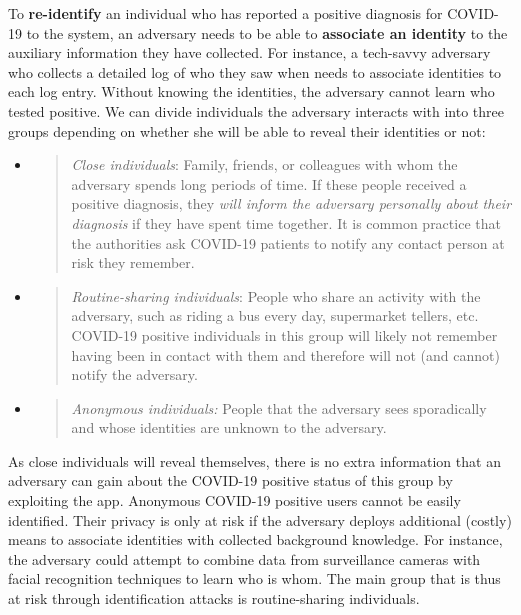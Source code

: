 \documentclass{article}
\begin{document}
To \textbf{re-identify} an individual who has reported a positive
diagnosis for COVID-19 to the system, an adversary needs to be able to
\textbf{associate an identity} to the auxiliary information they have
collected. For instance, a tech-savvy adversary who collects a detailed
log of who they saw when needs to associate identities to each log
entry. Without knowing the identities, the adversary cannot learn who
tested positive. We can divide individuals the adversary interacts with
into three groups depending on whether she will be able to reveal their
identities or not:

\begin{itemize}
\item
  \begin{quote}
  \emph{Close individuals}: Family, friends, or colleagues with whom the
  adversary spends long periods of time. If these people received a
  positive diagnosis, they \emph{will inform the adversary personally
  about their diagnosis} if they have spent time together. It is common
  practice that the authorities ask COVID-19 patients to notify any
  contact person at risk they remember.
  \end{quote}
\item
  \begin{quote}
  \emph{Routine-sharing individuals}: People who share an activity with
  the adversary, such as riding a bus every day, supermarket tellers,
  etc. COVID-19 positive individuals in this group will likely not
  remember having been in contact with them and therefore will not (and
  cannot) notify the adversary.
  \end{quote}
\item
  \begin{quote}
  \emph{Anonymous individuals:} People that the adversary sees
  sporadically and whose identities are unknown to the adversary.
  \end{quote}
\end{itemize}

As close individuals will reveal themselves, there is no extra
information that an adversary can gain about the COVID-19 positive
status of this group by exploiting the app. Anonymous COVID-19 positive
users cannot be easily identified. Their privacy is only at risk if the
adversary deploys additional (costly) means to associate identities with
collected background knowledge. For instance, the adversary could
attempt to combine data from surveillance cameras with facial
recognition techniques to learn who is whom. The main group that is thus
at risk through identification attacks is routine-sharing individuals.
\end{document}
